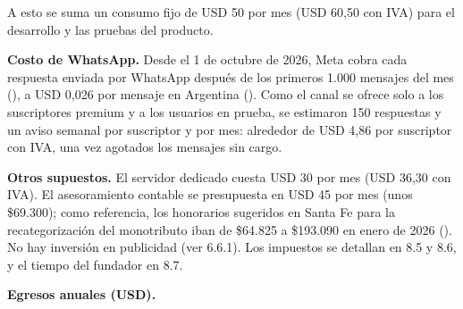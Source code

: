 A esto se suma un consumo fijo de USD 50 por mes (USD 60,50 con IVA)
para el desarrollo y las pruebas del producto.

\textbf{Costo de WhatsApp.} Desde el 1 de octubre de 2026, Meta cobra
cada respuesta enviada por WhatsApp después de los primeros 1.000
mensajes del mes (), a USD
0,026 por mensaje en Argentina
(). Como el canal se
ofrece solo a los suscriptores premium y a los usuarios en prueba, se
estimaron 150 respuestas y un aviso semanal por suscriptor y por mes:
alrededor de USD 4,86 por suscriptor con IVA, una vez agotados los
mensajes sin cargo.

\textbf{Otros supuestos.} El servidor dedicado cuesta USD 30 por mes
(USD 36,30 con IVA). El asesoramiento contable se presupuesta en USD 45
por mes (unos \$69.300); como referencia, los honorarios sugeridos en
Santa Fe para la recategorización del monotributo iban de \$64.825 a
\$193.090 en enero de 2026
(). No hay inversión
en publicidad (ver 6.6.1). Los impuestos se detallan en 8.5 y 8.6, y el
tiempo del fundador en 8.7.

\textbf{Egresos anuales (USD).}

